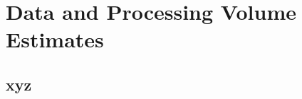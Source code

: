 \chapter{Data and Processing Volume Estimates}
\label{ch:est}

\section{xyz}
\label{sec:est:xyz}  %

